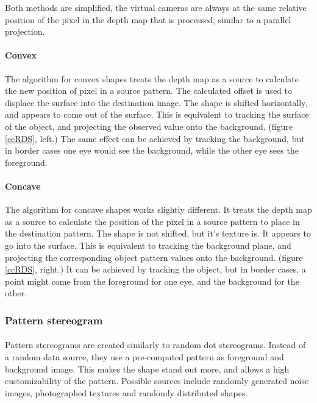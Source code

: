 Both methods are simplified, the virtual cameras are always at the same relative position of the pixel in the depth map that is processed, similar to a parallel projection.

\paragraph{Convex}
The algorithm for convex shapes treats the depth map as a source to calculate the new position of pixel in a source pattern. The calculated offset is used to displace the surface into the destination image. The shape is shifted horizontally, and appears to come out of the surface. This is equivalent to tracking the surface of the object, and projecting the observed value onto the background. (figure \ref{ccRDS}, left.)
The same effect can be achieved by tracking the background, but in border cases one eye would see the background, while the other eye sees the foreground.

\paragraph{Concave}
The algorithm for concave shapes works slightly different. It treats the depth map as a source to calculate the position of the pixel in a source pattern to place in the destination pattern. The shape is not shifted, but it's texture is. It appears to go into the surface. This is equivalent to tracking the background plane, and projecting the corresponding object pattern values onto the background. (figure \ref{ccRDS}, right.)
It can be achieved by tracking the object, but in border cases,  a point might come from the foreground for one eye, and the background for the other.

\subsubsection{Pattern stereogram}
\paragraph{}
Pattern stereograms are created similarly to random dot stereograms. Instead of a random data source, they use a pre-computed pattern as foreground and background image. This makes the shape stand out more, and allows a high customizability of the pattern. Possible sources include randomly generated noise images, photographed textures and randomly distributed shapes.


